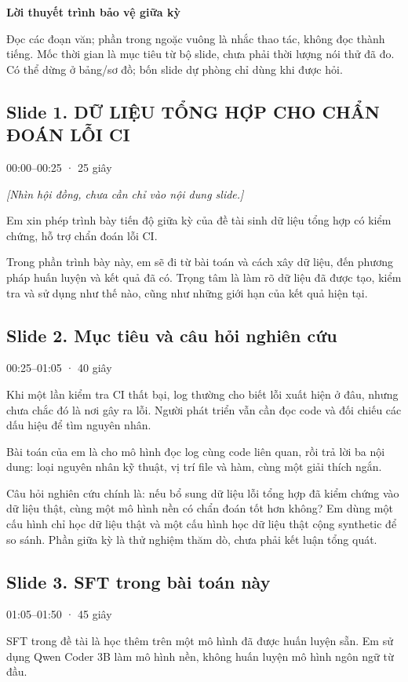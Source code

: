 \documentclass[12pt,a4paper]{article}
\begin{document}
{\Large\bfseries Lời thuyết trình bảo vệ giữa kỳ}\par
Đọc các đoạn văn; phần trong ngoặc vuông là nhắc thao tác, không đọc thành tiếng. Mốc thời gian là mục tiêu từ bộ slide, chưa phải thời lượng nói thử đã đo. Có thể dừng ở bảng/sơ đồ; bốn slide dự phòng chỉ dùng khi được hỏi.
\medskip
\subsection*{Slide 1. DỮ LIỆU TỔNG HỢP CHO CHẨN ĐOÁN LỖI CI}
{\small\color{gray}00:00–00:25 · 25 giây}\par
{\itshape\color{gray}[Nhìn hội đồng, chưa cần chỉ vào nội dung slide.]}\par
Em xin phép trình bày tiến độ giữa kỳ của đề tài sinh dữ liệu tổng hợp có kiểm chứng, hỗ trợ chẩn đoán lỗi CI.

Trong phần trình bày này, em sẽ đi từ bài toán và cách xây dữ liệu, đến phương pháp huấn luyện và kết quả đã có. Trọng tâm là làm rõ dữ liệu đã được tạo, kiểm tra và sử dụng như thế nào, cũng như những giới hạn của kết quả hiện tại.

\subsection*{Slide 2. Mục tiêu và câu hỏi nghiên cứu}
{\small\color{gray}00:25–01:05 · 40 giây}\par
Khi một lần kiểm tra CI thất bại, log thường cho biết lỗi xuất hiện ở đâu, nhưng chưa chắc đó là nơi gây ra lỗi. Người phát triển vẫn cần đọc code và đối chiếu các dấu hiệu để tìm nguyên nhân.

Bài toán của em là cho mô hình đọc log cùng code liên quan, rồi trả lời ba nội dung: loại nguyên nhân kỹ thuật, vị trí file và hàm, cùng một giải thích ngắn.

Câu hỏi nghiên cứu chính là: nếu bổ sung dữ liệu lỗi tổng hợp đã kiểm chứng vào dữ liệu thật, cùng một mô hình nền có chẩn đoán tốt hơn không? Em dùng một cấu hình chỉ học dữ liệu thật và một cấu hình học dữ liệu thật cộng synthetic để so sánh. Phần giữa kỳ là thử nghiệm thăm dò, chưa phải kết luận tổng quát.

\clearpage
\subsection*{Slide 3. SFT trong bài toán này}
{\small\color{gray}01:05–01:50 · 45 giây}\par
SFT trong đề tài là học thêm trên một mô hình đã được huấn luyện sẵn. Em sử dụng Qwen Coder 3B làm mô hình nền, không huấn luyện mô hình ngôn ngữ từ đầu.
\end{document}
